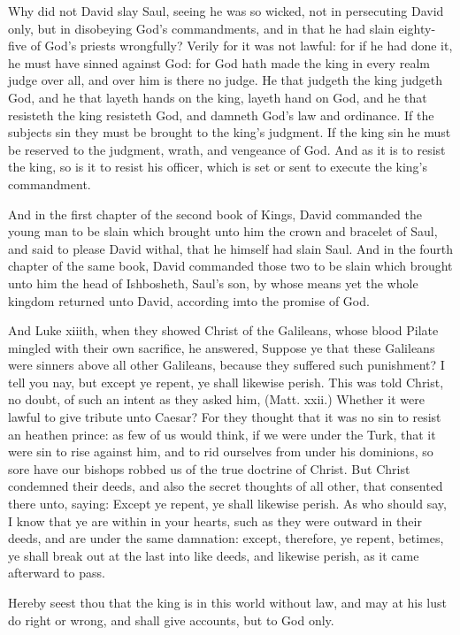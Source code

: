 Why did not David slay Saul, seeing he was so wicked,
not in persecuting David only, but in disobeying God's
commandments, and in that he had slain eighty-five of 
God's priests wrongfully? Verily for it was not lawful:
for if he had done it, he must have sinned against God:
for God hath made the king in every realm judge over 
all, and over him is there no judge. He that judgeth the 
king judgeth God, and he that layeth hands on the king, 
layeth hand on God, and he that resisteth the king resisteth
God, and damneth God's law and ordinance. If the 
subjects sin they must be brought to the king's judgment. 
If the king sin he must be reserved to the judgment, 
wrath, and vengeance of God. And as it is to resist the 
king, so is it to resist his officer, which is set or sent to 
execute the king's commandment. 

And in the first chapter of the second book of Kings, 
David commanded the young man to be slain which 
brought unto him the crown and bracelet of Saul, and said 
to please David withal, that he himself had slain Saul.
And in the fourth chapter of the same book, David commanded
those two to be slain which brought unto him the 
head of Ishbosheth, Saul's son, by whose means yet the
whole kingdom returned unto David, according imto the 
promise of God.

And Luke xiiith, when they showed Christ of the
Galileans, whose blood Pilate mingled with their own 
sacrifice, he answered, Suppose ye that these Galileans 
were sinners above all other Galileans, because they suffered
such punishment? I tell you nay, but except ye 
repent, ye shall likewise perish. This was told Christ, 
no doubt, of such an intent as they asked him, (Matt.
xxii.) Whether it were lawful to give tribute unto Caesar?
For they thought that it was no sin to resist an heathen 
prince: as few of us would think, if we were under the 
Turk, that it were sin to rise against him, and to rid ourselves
from under his dominions, so sore have our bishops 
robbed us of the true doctrine of Christ. But Christ 
condemned their deeds, and also the secret thoughts of 
all other, that consented there unto, saying: Except ye 
repent, ye shall likewise perish. As who should say, I 
know that ye are within in your hearts, such as they were 
outward in their deeds, and are under the same damnation:
except, therefore, ye repent, betimes, ye shall break out 
at the last into like deeds, and likewise perish, as it came 
afterward to pass. 

Hereby seest thou that the king is in this world without 
law, and may at his lust do right or wrong, and shall give 
accounts, but to God only. 


